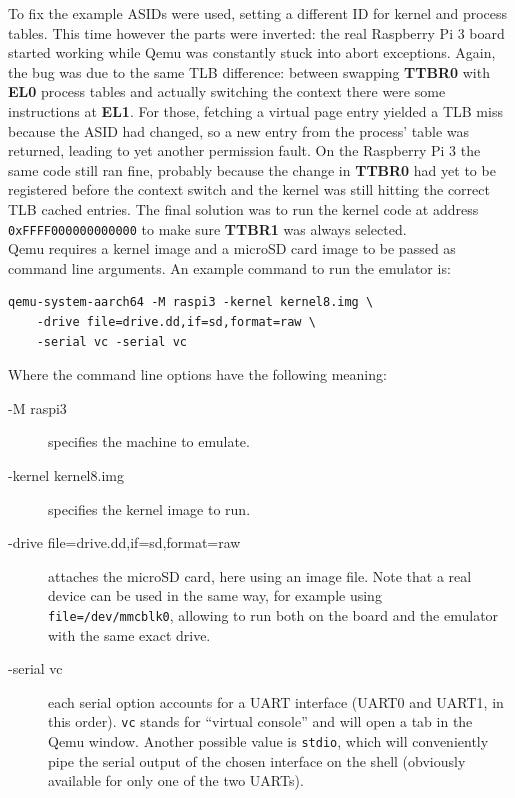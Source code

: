 \documentclass[12pt,a4paper,openright,twoside]{report}
\begin{document}
To fix the example ASIDs were used, setting a different ID for kernel and process
tables. This time however the parts were inverted: the real Raspberry Pi 3 board
started working while Qemu was constantly stuck into abort exceptions.
Again, the bug was due to the same TLB difference: between swapping \textbf{TTBR0}
with \textbf{EL0} process tables and actually switching the context there were 
some instructions at \textbf{EL1}. For those, fetching a virtual page entry 
yielded a TLB miss because the ASID had changed, so a new entry from the 
process' table was returned, leading to yet another permission fault.
On the Raspberry Pi 3 the same code still ran fine, probably because the change
in \textbf{TTBR0} had yet to be registered before the context switch and the
kernel was still hitting the correct TLB cached entries.
The final solution was to run the kernel code at address {\tt 0xFFFF000000000000}
to make sure \textbf{TTBR1} was always selected.\\

Qemu requires a kernel image and a microSD card image to be passed as command
line arguments. An example command to run the emulator is:
\begin{lstlisting}
qemu-system-aarch64 -M raspi3 -kernel kernel8.img \
    -drive file=drive.dd,if=sd,format=raw \
    -serial vc -serial vc
\end{lstlisting}

Where the command line options have the following meaning:
\begin{description}
    \item[-M raspi3] specifies the machine to emulate.
    \item[-kernel kernel8.img] specifies the kernel image to run.
    \item[-drive file=drive.dd,if=sd,format=raw] attaches the microSD card, here
        using an image file. Note that a real device can be used in the same way,
        for example using {\tt file=/dev/mmcblk0}, allowing to run both on the
        board and the emulator with the same exact drive.
    \item[-serial vc] each serial option accounts for a UART interface (UART0 and UART1,
        in this order). {\tt vc} stands for ``virtual console'' and will open a 
        tab in the Qemu window. Another possible value is {\tt stdio}, which will
        conveniently pipe the serial output of the chosen interface on the shell
        (obviously available for only one of the two UARTs).
\end{description}
\end{document}
